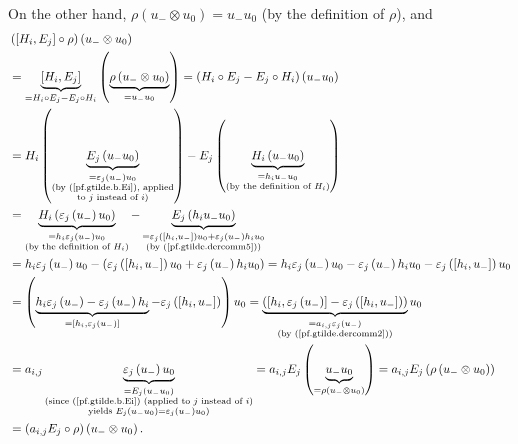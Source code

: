 \documentclass[etingof-lie.tex]{subfiles}
\begin{document}
\begin{verlong}
On the other hand, $\rho\left(  u_{-}\otimes u_{0}\right)  =u_{-}u_{0}$ (by
the definition of $\rho$), and%
\begin{align*}
&  \left(  \left[  H_{i},E_{j}\right]  \circ\rho\right)  \left(  u_{-}\otimes
u_{0}\right) \\
&  =\underbrace{\left[  H_{i},E_{j}\right]  }_{=H_{i}\circ E_{j}-E_{j}\circ
H_{i}}\left(  \underbrace{\rho\left(  u_{-}\otimes u_{0}\right)  }%
_{=u_{-}u_{0}}\right)  =\left(  H_{i}\circ E_{j}-E_{j}\circ H_{i}\right)
\left(  u_{-}u_{0}\right) \\
&  =H_{i}\left(  \underbrace{E_{j}\left(  u_{-}u_{0}\right)  }%
_{\substack{=\varepsilon_{j}\left(  u_{-}\right)  u_{0}\\\text{(by
(\ref{pf.gtilde.b.Ei}), applied}\\\text{to }j\text{ instead of }i\text{)}%
}}\right)  -E_{j}\left(  \underbrace{H_{i}\left(  u_{-}u_{0}\right)
}_{\substack{=h_{i}u_{-}u_{0}\\\text{(by the definition of }H_{i}\text{)}%
}}\right) \\
&  =\underbrace{H_{i}\left(  \varepsilon_{j}\left(  u_{-}\right)
u_{0}\right)  }_{\substack{=h_{i}\varepsilon_{j}\left(  u_{-}\right)
u_{0}\\\text{(by the definition of }H_{i}\text{)}}}-\underbrace{E_{j}\left(
h_{i}u_{-}u_{0}\right)  }_{\substack{=\varepsilon_{j}\left(  \left[
h_{i},u_{-}\right]  \right)  u_{0}+\varepsilon_{j}\left(  u_{-}\right)
h_{i}u_{0}\\\text{(by (\ref{pf.gtilde.dercomm5}))}}}\\
&  =h_{i}\varepsilon_{j}\left(  u_{-}\right)  u_{0}-\left(  \varepsilon
_{j}\left(  \left[  h_{i},u_{-}\right]  \right)  u_{0}+\varepsilon_{j}\left(
u_{-}\right)  h_{i}u_{0}\right)  =h_{i}\varepsilon_{j}\left(  u_{-}\right)
u_{0}-\varepsilon_{j}\left(  u_{-}\right)  h_{i}u_{0}-\varepsilon_{j}\left(
\left[  h_{i},u_{-}\right]  \right)  u_{0}\\
&  =\left(  \underbrace{h_{i}\varepsilon_{j}\left(  u_{-}\right)
-\varepsilon_{j}\left(  u_{-}\right)  h_{i}}_{=\left[  h_{i},\varepsilon
_{j}\left(  u_{-}\right)  \right]  }-\varepsilon_{j}\left(  \left[
h_{i},u_{-}\right]  \right)  \right)  u_{0}=\underbrace{\left(  \left[
h_{i},\varepsilon_{j}\left(  u_{-}\right)  \right]  -\varepsilon_{j}\left(
\left[  h_{i},u_{-}\right]  \right)  \right)  }_{\substack{=a_{i,j}%
\varepsilon_{j}\left(  u_{-}\right)  \\\text{(by (\ref{pf.gtilde.dercomm2}))}%
}}u_{0}\\
&  =a_{i,j}\underbrace{\varepsilon_{j}\left(  u_{-}\right)  u_{0}%
}_{\substack{=E_{j}\left(  u_{-}u_{0}\right)  \\\text{(since
(\ref{pf.gtilde.b.Ei}) (applied to }j\text{ instead of }i\text{)}%
\\\text{yields }E_{j}\left(  u_{-}u_{0}\right)  =\varepsilon_{j}\left(
u_{-}\right)  u_{0}\text{)}}}=a_{i,j}E_{j}\left(  \underbrace{u_{-}u_{0}%
}_{=\rho\left(  u_{-}\otimes u_{0}\right)  }\right)  =a_{i,j}E_{j}\left(
\rho\left(  u_{-}\otimes u_{0}\right)  \right) \\
&  =\left(  a_{i,j}E_{j}\circ\rho\right)  \left(  u_{-}\otimes u_{0}\right)  .
\end{align*}



\end{verlong}
\end{document}
